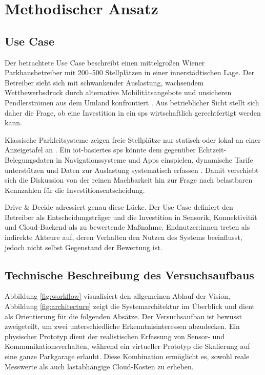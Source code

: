 \section{Methodischer Ansatz}\label{sec:methodology}

\subsection{Use Case}

Der betrachtete Use Case beschreibt einen mittelgroßen Wiener Parkhausbetreiber mit \mbox{200--500} Stellplätzen in einer innerstädtischen Lage. Der Betreiber sieht sich mit schwankender Auslastung, wachsendem Wettbewerbsdruck durch alternative Mobilitätsangebote und unsicheren Pendlerströmen aus dem Umland konfrontiert \citep{wangEconomicsSmartParking2025}. Aus betrieblicher Sicht stellt sich daher die Frage, ob eine Investition in ein \ac{sps} wirtschaftlich gerechtfertigt werden kann.

Klassische Parkleitsysteme zeigen freie Stellplätze nur statisch oder lokal an einer Anzeigetafel an \citep{stadtwienParkleitsystemFuerWien2026}. Ein \ac{iot}-basiertes \ac{sps} könnte dem gegenüber Echtzeit-Belegungsdaten in Navigationssysteme und Apps einspielen, dynamische Tarife unterstützen und Daten zur Auslastung systematisch erfassen \citep{sarkerSmartParkingSystem2020}. Damit verschiebt sich die Diskussion von der reinen Machbarkeit hin zur Frage nach belastbaren Kennzahlen für die Investitionsentscheidung.

Drive \& Decide adressiert genau diese Lücke. Der Use Case definiert den Betreiber als Entscheidungsträger und die Investition in Sensorik, Konnektivität und Cloud-Backend als zu bewertende Maßnahme. Endnutzer:innen treten als indirekte Akteure auf, deren Verhalten den Nutzen des Systems beeinflusst, jedoch nicht selbst Gegenstand der Bewertung ist.

\subsection{Technische Beschreibung des Versuchsaufbaus} \label{sec:technical-setup}

Abbildung \ref{fig:workflow} visualisiert den allgemeinen Ablauf der Vision, 
Abbildung \ref{fig:architecture} zeigt die Systemarchitektur im Überblick und dient als Orientierung für die folgenden Absätze. Der Versuchsaufbau ist bewusst zweigeteilt, um zwei unterschiedliche Erkenntnisinteressen abzudecken. Ein physischer Prototyp dient der realistischen Erfassung von Sensor- und Kommunikationsverhalten, während ein virtueller Prototyp die Skalierung auf eine ganze Parkgarage erlaubt. Diese Kombination ermöglicht es, sowohl reale Messwerte als auch lastabhängige Cloud-Kosten zu erheben.


